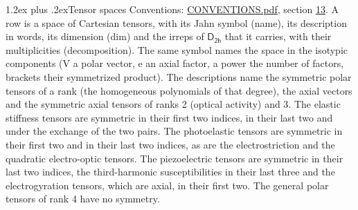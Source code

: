 \documentclass[10pt,a4paper]{article}
\makeatletter
\renewcommand\section{\@startsection{section}{1}{\z@}{-3ex plus -1ex minus -.2ex}%
  {1.2ex plus .2ex}{\normalfont\large\sffamily\bfseries\color{parttitle}}}
\numberwithin{equation}{section}
\newcommand{\grp}[1]{\mathsf{#1}}
\makeatother
\begin{document}
\section{Tensor spaces}\label{s:tensor_spaces}
Conventions: \href{../../CONVENTIONS.pdf}{CONVENTIONS.pdf}, section \href{../../CONVENTIONS.pdf\#conv.13}{13}.
\leavevmode\label{n:head.name}\label{n:head.description}\label{n:head.dim}\label{n:head.decomposition}A row is a space of Cartesian tensors, with its Jahn symbol (name), its description in words, its dimension (dim) and the irreps of $\grp{D_{2h}}$ that it carries, with their multiplicities (decomposition). \label{n:label.jahn}The same symbol names the space in the isotypic components (V a polar vector, e an axial factor, a power the number of factors, brackets their symmetrized product). The descriptions name the symmetric polar tensors of a rank (the homogeneous polynomials of that degree), the axial vectors and the symmetric axial tensors of ranks 2 (optical activity) and 3. The elastic stiffness tensors are symmetric in their first two indices, in their last two and under the exchange of the two pairs. The photoelastic tensors are symmetric in their first two and in their last two indices, as are the electrostriction and the quadratic electro-optic tensors. The piezoelectric tensors are symmetric in their last two indices, the third-harmonic susceptibilities in their last three and the electrogyration tensors, which are axial, in their first two. The general polar tensors of rank 4 have no symmetry.
\end{document}

